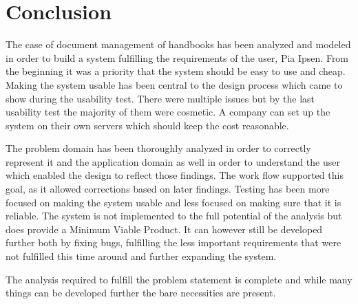 \chapter{Conclusion}
The case of document management of handbooks has been analyzed and modeled in order to build a system fulfilling the requirements of the user, Pia Ipsen.
From the beginning it was a priority that the system should be easy to use and cheap.
Making the system usable has been central to the design process which came to show during the usability test.
There were multiple issues but by the last usability test the majority of them were cosmetic.
A company can set up the system on their own servers which should keep the cost reasonable.

The problem domain has been thoroughly analyzed in order to correctly represent it and the application domain as well in order to understand the user which enabled the design to reflect those findings.
The work flow supported this goal, as it allowed corrections based on later findings.
Testing has been more focused on making the system usable and less focused on making sure that it is reliable.
The system is not implemented to the full potential of the analysis but does provide a Minimum Viable Product.
It can however still be developed further both by fixing bugs, fulfilling the less important requirements that were not fulfilled this time around and further expanding the system.

The analysis required to fulfill the problem statement is complete and while many things can be developed further the bare necessities are present.
